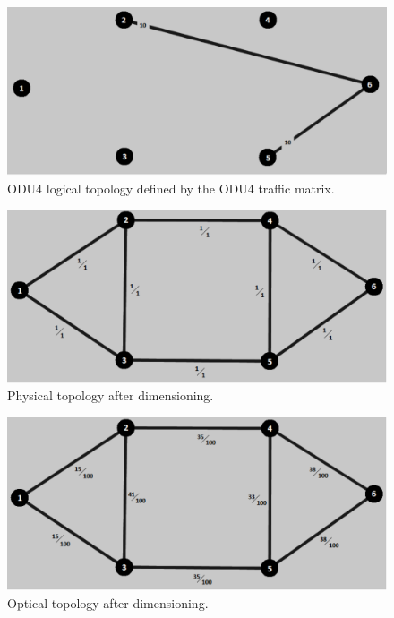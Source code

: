 \begin{figure}[H]
\centering
\includegraphics[width=13cm]{sdf/heuristic/opaque_protection/figures/logical_topology_odu4_medium}
\caption{ODU4 logical topology defined by the ODU4 traffic matrix.}
\label{logical_ODU4_protec_ref_medium_heuristic}
\end{figure}

\begin{figure}[H]
\centering
\includegraphics[width=13cm]{sdf/heuristic/opaque_protection/figures/physical_topology}
\caption{Physical topology after dimensioning.}
\label{physical_topology_protec_ref_medium_heuristic}
\end{figure}

\begin{figure}[H]
\centering
\includegraphics[width=13cm]{sdf/heuristic/opaque_protection/figures/optical_topology_medium}
\caption{Optical topology after dimensioning.}
\label{optical_topology_protec_ref_medium_heuristic}
\end{figure}

